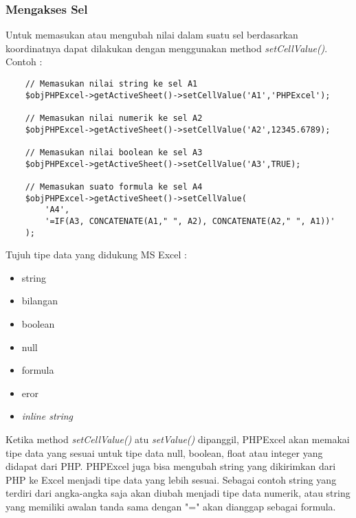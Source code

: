 \subsubsection{Mengakses Sel}
Untuk memasukan atau mengubah nilai dalam suatu sel berdasarkan koordinatnya dapat dilakukan dengan menggunakan method \textit{setCellValue()}.\\
Contoh :
\begin{lstlisting}
	// Memasukan nilai string ke sel A1
	$objPHPExcel->getActiveSheet()->setCellValue('A1','PHPExcel');

	// Memasukan nilai numerik ke sel A2
	$objPHPExcel->getActiveSheet()->setCellValue('A2',12345.6789);

	// Memasukan nilai boolean ke sel A3
	$objPHPExcel->getActiveSheet()->setCellValue('A3',TRUE);
	
	// Memasukan suato formula ke sel A4
	$objPHPExcel->getActiveSheet()->setCellValue(
	    'A4', 
	    '=IF(A3, CONCATENATE(A1," ", A2), CONCATENATE(A2," ", A1))'
	);
\end{lstlisting}
Tujuh tipe data yang didukung MS Excel :
\begin{itemize}
 	\item string
 	\item bilangan
 	\item boolean
 	\item null
 	\item formula
 	\item eror
 	\item \textit{inline string}
\end{itemize}
Ketika method \textit{setCellValue()} atu \textit{setValue()} dipanggil, PHPExcel akan memakai tipe data yang sesuai untuk tipe data null, boolean, float atau integer yang didapat dari PHP. PHPExcel juga bisa mengubah string yang dikirimkan dari PHP ke Excel menjadi tipe data yang lebih sesuai. Sebagai contoh string yang terdiri dari angka-angka saja akan diubah menjadi tipe data numerik, atau string yang memiliki awalan tanda sama dengan "=" akan dianggap sebagai formula.

